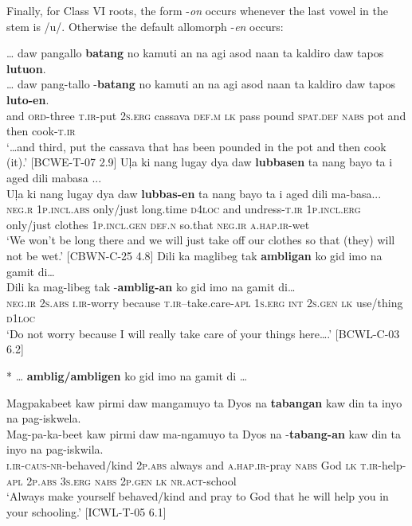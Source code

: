 Finally, for Class VI roots, the form -\textit{on} occurs whenever the last vowel in the stem is /u/. Otherwise the default allomorph -\textit{en} occurs:

\ea
\label{bkm:Ref119939353}
… daw  pangallo  \textbf{batang}  no  kamuti  an  na  agi  asod  naan ta  kaldiro  daw  tapos  \textbf{lutuon}. \\\smallskip
 \gll … daw  pang-tallo  \emptyset{}-\textbf{batang}  no  kamuti  an  na  agi  asod  naan ta  kaldiro  daw  tapos  \textbf{luto-en}. \\
{} and  \textsc{ord}-three  \textsc{t.ir}-put  2\textsc{s.erg}  cassava  \textsc{def.m}  \textsc{lk}  pass  pound  \textsc{spat.def}
\textsc{nabs}  pot  and  then  cook-\textsc{t.ir} \\
\glt `…and third, put the cassava that has been pounded in the pot and then cook (it).’ [BCWE-T-07 2.9]
\z
\ea
\label{bkm:Ref119939420}
Uļa  ki  nang  lugay  dya  daw  \textbf{lubbasen}  ta nang  bayo  ta  i  aged  dili  mabasa ... \\\smallskip
 \gll Uļa  ki  nang  lugay  dya  daw  \textbf{lubbas-en}  ta nang  bayo  ta  i  aged  dili  ma-basa{}... \\
\textsc{neg.r} 1\textsc{p.incl.abs}  only/just  long.time  \textsc{d}4\textsc{loc}  and  undress-\textsc{t.ir}  1\textsc{p.incl.erg}
only/just  clothes  1\textsc{p.incl.gen}  \textsc{def.n}  so.that  \textsc{neg.ir}  \textsc{a.hap.ir}-wet \\
\glt `We won’t be long there and we will just take off our clothes so that (they) will not be wet.’ [CBWN-C-25 4.8]
\z
\ea
\label{ex:yourthings}
Dili ka maglibeg tak \textbf{ambligan} ko gid imo na gamit di… \\\smallskip
 \gll Dili	ka	mag-libeg	tak	\emptyset{}-\textbf{amblig-an}	ko	gid	imo	na	gamit	di… \\
\textsc{neg.ir}	2\textsc{s.abs}	\textsc{i.ir}-worry	because	\textsc{t.ir}–take.care-\textsc{apl}	1\textsc{s.erg}	\textsc{int}	2\textsc{s.gen}	\textsc{lk}	use/thing	\textsc{d1loc} \\
\glt `Do not worry because I will really take care of your things here….' [BCWL-C-03 6.2] \\\smallskip

* … \textbf{amblig/ambligen} ko gid imo na gamit di …
\z

\largerpage[2]
\ea
\label{ex:yourschooling}
Magpakabeet kaw pirmi daw mangamuyo ta Dyos na \textbf{tabangan} kaw din ta inyo na pag-iskwela. \\\smallskip
 \gll Mag-pa-ka-beet	kaw	pirmi	daw	ma-ngamuyo	ta	Dyos	na	\emptyset{}-\textbf{tabang-an} kaw	din	ta	inyo	na	pag-iskwila. \\
\textsc{i.ir}-\textsc{caus}-\textsc{nr}-behaved/kind	2\textsc{p.abs}	always	and	\textsc{a.hap.ir}-pray	\textsc{nabs}	God	\textsc{lk}	\textsc{t.ir}-help-\textsc{apl}
2\textsc{p.abs}	3\textsc{s.erg}	\textsc{nabs}	2\textsc{p.gen}	\textsc{lk}	\textsc{nr.act}-school \\
\glt ‘Always make yourself behaved/kind and pray to God that he will help you in your schooling.’ [ICWL-T-05 6.1] \\\smallskip

